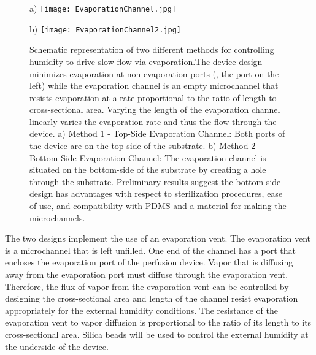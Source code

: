 \begin{figure}[!ht]
\centering
a) \texttt{[image: EvaporationChannel.jpg]}


\vspace{0.5cm}


b) \texttt{[image: EvaporationChannel2.jpg]}
\caption{Schematic representation of two different methods for controlling humidity to drive slow flow via evaporation.The device design minimizes evaporation at non-evaporation ports (\ie , the port on the left) while the evaporation channel is an empty microchannel that resists evaporation at a rate proportional to the ratio of length to cross-sectional area. Varying the length of the evaporation channel linearly varies the evaporation rate and thus the flow through the device. a) Method 1 - Top-Side Evaporation Channel:  Both ports of the device are on the top-side of the substrate. b) Method 2 - Bottom-Side Evaporation Channel:  The evaporation channel is situated on the bottom-side of the substrate by creating a hole through the substrate. Preliminary results suggest the bottom-side design has advantages with respect to sterilization procedures, ease of use, and compatibility with PDMS and a material for making the microchannels.}
\label{fig:evaporationDevices}
\end{figure}

The two designs implement the use of an evaporation vent. The evaporation vent is a microchannel that is left unfilled. One end of the channel has a port that encloses the evaporation port of the perfusion device. Vapor that is diffusing away from the evaporation port must diffuse through the evaporation vent. Therefore, the flux of vapor from the evaporation vent can be controlled by designing the cross-sectional area and length of the channel resist evaporation appropriately for the external humidity conditions. The resistance of the evaporation vent to vapor diffusion is proportional to the ratio of its length to its cross-sectional area. Silica beads will be used to control the external humidity at the underside of the device. 


